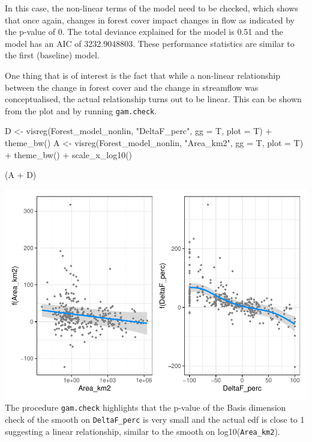 \documentclass[]{elsarticle} %
\newenvironment{Shaded}{\begin{snugshade}}{\end{snugshade}}
\newcommand{\AttributeTok}[1]{\textcolor[rgb]{0.77,0.63,0.00}{#1}}
\newcommand{\FunctionTok}[1]{\textcolor[rgb]{0.00,0.00,0.00}{#1}}
\newcommand{\NormalTok}[1]{#1}
\newcommand{\OtherTok}[1]{\textcolor[rgb]{0.56,0.35,0.01}{#1}}
\newcommand{\SpecialCharTok}[1]{\textcolor[rgb]{0.00,0.00,0.00}{#1}}
\newcommand{\StringTok}[1]{\textcolor[rgb]{0.31,0.60,0.02}{#1}}
\begin{document}
In this case, the non-linear terms of the model need to be checked, which shows that once again, changes in forest cover impact changes in flow as indicated by the p-value of 0. The total deviance explained for the model is 0.51 and the model has an AIC of 3232.9048803. These performance statistics are similar to the first (baseline) model.

One thing that is of interest is the fact that while a non-linear relationship between the change in forest cover and the change in streamflow was conceptualised, the actual relationship turns out to be linear. This can be shown from the plot and by running \texttt{gam.check}.

\begin{Shaded}
\begin{Highlighting}[]
\NormalTok{D }\OtherTok{\textless{}{-}} \FunctionTok{visreg}\NormalTok{(Forest\_model\_nonlin, }\StringTok{"DeltaF\_perc"}\NormalTok{, }\AttributeTok{gg =}\NormalTok{ T, }\AttributeTok{plot =}\NormalTok{ T) }\SpecialCharTok{+} \FunctionTok{theme\_bw}\NormalTok{()}
\NormalTok{A }\OtherTok{\textless{}{-}} \FunctionTok{visreg}\NormalTok{(Forest\_model\_nonlin, }\StringTok{"Area\_km2"}\NormalTok{, }\AttributeTok{gg =}\NormalTok{ T, }\AttributeTok{plot =}\NormalTok{ T) }\SpecialCharTok{+} \FunctionTok{theme\_bw}\NormalTok{() }\SpecialCharTok{+} 
  \FunctionTok{scale\_x\_log10}\NormalTok{()}

\NormalTok{(A }\SpecialCharTok{+}\NormalTok{ D)}
\end{Highlighting}
\end{Shaded}

\includegraphics{SupplementaryMaterialPart3_files/figure-latex/unnamed-chunk-10-1.pdf}
The procedure \texttt{gam.check} highlights that the p-value of the Basis dimension check of the smooth on \texttt{DeltaF\_perc} is very small and the actual edf is close to 1 suggesting a linear relationship, similar to the smooth on log10(\texttt{Area\_km2}).
\end{document}
